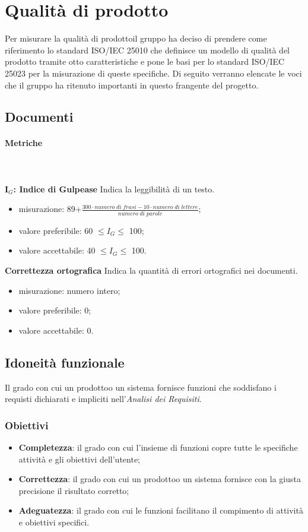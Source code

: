 \section{Qualità di prodotto}
    Per misurare la qualità di prodotto\glosp il gruppo ha deciso di prendere come riferimento lo standard ISO/IEC 25010 che definisce un modello di qualità del prodotto tramite otto caratteristiche e pone le basi per lo standard ISO/IEC 25023 per la misurazione di queste specifiche. Di seguito verranno elencate le voci che il gruppo ha ritenuto importanti in questo frangente del progetto\glo.
    \subsection{Documenti}
	    \paragraph{Metriche} \mbox{} \\ \\
	    \textbf{I$_{G}$: Indice di Gulpease} Indica la leggibilità di un testo.
	    \begin{itemize}
	    	\item misurazione: 89+$\frac{300\cdot numero \; di \; frasi-10\cdot numero \; di \; lettere}{numero \; di \; parole}$;
	    	\item valore preferibile: 60 $\le I_{G} \le$ 100;
	    	\item valore accettabile: 40 $\le I_{G} \le$ 100.
	    \end{itemize}
	    \textbf{Correttezza ortografica} Indica la quantità di errori ortografici nei documenti.
	    \begin{itemize}
	    	\item misurazione: numero intero;
	    	\item valore preferibile: 0;
	    	\item valore accettabile: 0.
	    \end{itemize}
    \subsection{Idoneità funzionale}
        Il grado con cui un prodotto\glosp o un sistema fornisce funzioni che soddisfano i requisti dichiarati e impliciti nell'\textit{Analisi dei Requisiti}.
        \subsubsection{Obiettivi}
            \begin{itemize}
                \item \textbf{Completezza}: il grado con cui l'insieme di funzioni copre tutte le specifiche attività e gli obiettivi dell'utente;
                \item \textbf{Correttezza}: il grado con cui un prodotto\glosp o un sistema fornisce con la giusta precisione il risultato corretto;
                \item \textbf{Adeguatezza}: il grado con cui le funzioni facilitano il compimento di attività e obiettivi specifici.
            \end{itemize}
